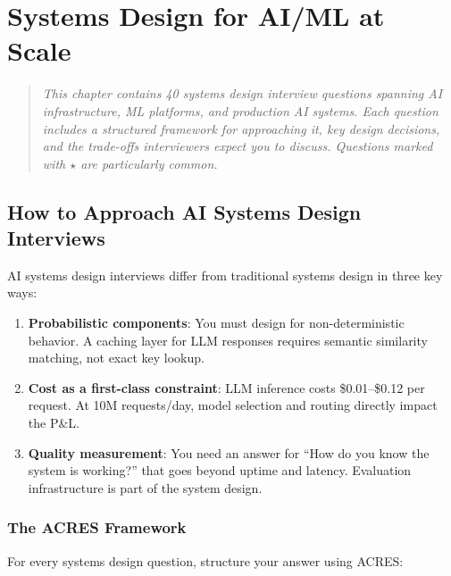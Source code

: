 \chapter{Systems Design for AI/ML at Scale}
\label{ch:systems-design-interviews}

\begin{quote}
\itshape
This chapter contains 40 systems design interview questions spanning AI infrastructure, ML platforms, and production AI systems. Each question includes a structured framework for approaching it, key design decisions, and the trade-offs interviewers expect you to discuss. Questions marked with $\star$ are particularly common.
\end{quote}

\vspace{0.5cm}


\section{How to Approach AI Systems Design Interviews}

AI systems design interviews differ from traditional systems design in three key ways:

\begin{enumerate}[leftmargin=*]
    \item \textbf{Probabilistic components}: You must design for non-deterministic behavior. A caching layer for LLM responses requires semantic similarity matching, not exact key lookup.
    \item \textbf{Cost as a first-class constraint}: LLM inference costs \$0.01--\$0.12 per request. At 10M requests/day, model selection and routing directly impact the P\&L.
    \item \textbf{Quality measurement}: You need an answer for ``How do you know the system is working?'' that goes beyond uptime and latency. Evaluation infrastructure is part of the system design.
\end{enumerate}

\subsection{The ACRES Framework}

For every systems design question, structure your answer using ACRES:


